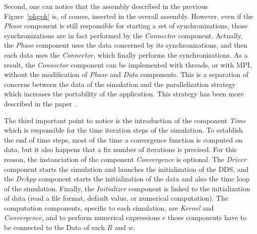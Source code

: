 Second, one can notice that the assembly described in the previous Figure~\ref{phgpk} is, of course, inserted in the overall assembly. However, even if the \textit{Phase} component is still responsible for starting a set of synchronizations, those synchronizations are in fact performed by the \textit{Connector} component. Actually, the \textit{Phase} component uses the data concerned by its synchronizations, and then each data uses the \textit{Connector}, which finally performs the synchronizations. As a result, the \textit{Connector} component can be implemented with threads, or with MPI, without the modification of \textit{Phase} and \textit{Data} components. This is a separation of concerns between the data of the simulation and the parallelization strategy which increases the portability of the application. This strategy has been more described in the paper~\cite{}. 

The third important point to notice is the introduction of the component \textit{Time} which is responsible for the time iteration steps of the simulation. To establish the end of time steps, most of the time a convergence function is computed on data, but it also happens that a fix number of iterations is precised. For this reason, the instanciation of the component \textit{Convergence} is optional. The \textit{Driver} component starts the simulation and launches the initialization of the DDS, and the \textit{DrApp} component starts the initialization of the data and also the time loop of the simulation. Finally, the \textit{Initializer} component is linked to the initialization of data (read a file format, default value, or numerical computation). The computation components, specific to each simulation, are \textit{Kernel} and \textit{Convergence}, and to perform numerical expressions $e$ those components have to be connected to the Data of each $R$ and $w$.


